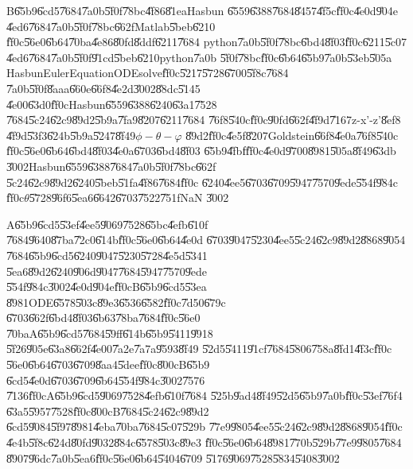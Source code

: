 B\U{65b9}\U{6cd5}\U{7684}\U{7a0b}\U{5f0f}\U{78bc}\U{4f86}\U{81ea}Hasbun%
\U{6559}\U{6388}\U{7684}\U{8457}\U{4f5c}\cite{hasbun}\U{ff0c}\U{4e0d}\U{904e}%
\U{4ed6}\U{7684}\U{7a0b}\U{5f0f}\U{78bc}\U{662f}Matlab\U{5beb}\U{6210}%
\U{ff0c}\U{56e0}\U{6b64}\U{70ba}\U{4e86}\U{80fd}\U{8ddf}\U{6211}\U{7684}%
python\U{7a0b}\U{5f0f}\U{78bc}\U{6bd4}\U{8f03}\U{ff0c}\U{6211}\U{5c07}%
\U{4ed6}\U{7684}\U{7a0b}\U{5f0f}\U{91cd}\U{5beb}\U{6210}python\U{7a0b}%
\U{5f0f}\U{78bc}\U{ff0c}\U{6b64}\U{65b9}\U{7a0b}\U{53eb}\U{505a}%
HasbunEulerEquationODEsolve\U{ff0c}\U{5217}\U{5728}\U{6700}\U{5f8c}\U{7684}%
\U{7a0b}\U{5f0f}\U{8aaa}\U{660e}\U{66f8}\U{4e2d}\U{3002}\U{88dc}\U{5145}%
\U{4e00}\U{63d0}\U{ff0c}Hasbun\U{6559}\U{6388}\U{6240}\U{63a1}\U{7528}%
\U{7684}\U{5c24}\U{62c9}\U{89d2}\U{5b9a}\U{7fa9}\U{8207}\U{6211}\U{7684}%
\U{76f8}\U{540c}\U{ff0c}\U{90fd}\U{662f}\U{4f9d}\U{7167}z-x'-z'\U{8ef8}%
\U{4f9d}\U{53f3}\U{624b}\U{5b9a}\U{5247}\U{8f49}$\phi -\theta -\varphi $%
\U{89d2}\U{ff0c}\U{4e5f}\U{8207}Goldstein\U{66f8}\U{4e0a}\U{76f8}\U{540c}%
\U{ff0c}\U{56e0}\U{6b64}\U{6bd4}\U{8f03}\U{4e0a}\U{6703}\U{6bd4}\U{8f03}%
\U{65b9}\U{4fbf}\U{ff0c}\U{4e0d}\U{9700}\U{8981}\U{505a}\U{8f49}\U{63db}%
\U{3002}Hasbun\U{6559}\U{6388}\U{7684}\U{7a0b}\U{5f0f}\U{78bc}\U{662f}%
\U{5c24}\U{62c9}\U{89d2}\U{6240}\U{5beb}\U{51fa}\U{4f86}\U{7684}\U{ff0c}%
\U{6240}\U{4ee5}\U{6703}\U{6709}\U{5947}\U{7570}\U{9ede}\U{554f}\U{984c}%
\U{ff0c}$\theta $\U{5728}\U{96f6}\U{5ea6}\U{6642}\U{6703}\U{7522}\U{751f}NaN%
\U{3002}

A\U{65b9}\U{6cd5}\U{53ef}\U{4ee5}\U{9069}\U{7528}\U{65bc}\U{4efb}\U{610f}%
\U{7684}\U{9640}\U{87ba}\U{72c0}\U{614b}\U{ff0c}\U{56e0}\U{6b64}\U{4e0d}%
\U{6703}\U{9047}\U{5230}\U{4ee5}\U{5c24}\U{62c9}\U{89d2}\U{8868}\U{9054}%
\U{7684}\U{65b9}\U{6cd5}\U{6240}\U{9047}\U{5230}\U{5728}\U{4e5d}\U{5341}%
\U{5ea6}\U{89d2}\U{6240}\U{906d}\U{9047}\U{7684}\U{5947}\U{7570}\U{9ede}%
\U{554f}\U{984c}\U{3002}\U{4e0d}\U{904e}\U{ff0c}B\U{65b9}\U{6cd5}\U{53ea}%
\U{8981}ODE\U{6578}\U{503c}\U{89e3}\U{6536}\U{6582}\U{ff0c}\U{7d50}\U{679c}%
\U{6703}\U{662f}\U{6bd4}\U{8f03}\U{6b63}\U{78ba}\U{7684}\U{ff0c}\U{56e0}%
\U{70ba}A\U{65b9}\U{6cd5}\U{7684}\U{59ff}\U{614b}\U{65b9}\U{5411}\U{9918}%
\U{5f26}\U{905e}\U{63a8}\U{662f}\U{4e00}\U{7a2e}\U{7a7a}\U{9593}\U{8f49}%
\U{52d5}\U{5411}\U{91cf}\U{7684}\U{5806}\U{758a}\U{8fd1}\U{4f3c}\U{ff0c}%
\U{56e0}\U{6b64}\U{6703}\U{6709}\U{8aa4}\U{5dee}\U{ff0c}\U{800c}B\U{65b9}%
\U{6cd5}\U{4e0d}\U{6703}\U{6709}\U{6b64}\U{554f}\U{984c}\U{3002}\U{7576}%
\U{7136}\U{ff0c}A\U{65b9}\U{6cd5}\U{9069}\U{7528}\U{4efb}\U{610f}\U{7684}%
\U{525b}\U{9ad4}\U{8f49}\U{52d5}\U{65b9}\U{7a0b}\U{ff0c}\U{53ef}\U{76f4}%
\U{63a5}\U{5957}\U{7528}\U{ff0c}\U{800c}B\U{7684}\U{5c24}\U{62c9}\U{89d2}%
\U{6cd5}\U{9084}\U{5f97}\U{8981}\U{4eba}\U{70ba}\U{7684}\U{5c07}\U{529b}%
\U{77e9}\U{9805}\U{4ee5}\U{5c24}\U{62c9}\U{89d2}\U{8868}\U{9054}\U{ff0c}%
\U{4e4b}\U{5f8c}\U{624d}\U{80fd}\U{9032}\U{884c}\U{6578}\U{503c}\U{89e3}%
\U{ff0c}\U{56e0}\U{6b64}\U{8981}\U{770b}\U{529b}\U{77e9}\U{9805}\U{7684}%
\U{8907}\U{96dc}\U{7a0b}\U{5ea6}\U{ff0c}\U{56e0}\U{6b64}\U{5404}\U{6709}%
\U{5176}\U{9069}\U{7528}\U{5834}\U{5408}\U{3002}

